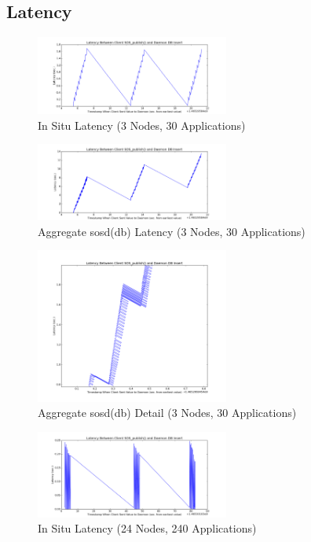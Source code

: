 
\subsection{Latency}


\begin{figure}[!t]
\centering
\includegraphics[width=2.5in]{images/aciss_latency_3_situ.png}
\caption{In Situ Latency (3 Nodes, 30 Applications)}
\label{fig_sim}
\end{figure}

\begin{figure}[!t]
\centering
\includegraphics[width=2.5in]{images/aciss_latency_3_agg.png}
\caption{Aggregate sosd(db) Latency (3 Nodes, 30 Applications)}
\label{fig_sim}
\end{figure}

\begin{figure}[!t]
\centering
\includegraphics[width=2.5in]{images/aciss_latency_3_agg_zm.png}
\caption{Aggregate sosd(db) Detail (3 Nodes, 30 Applications)}
\label{fig_sim}
\end{figure}


\begin{figure}[!t]
\centering
\includegraphics[width=2.5in]{images/aciss_latency_24_situ.png}
\caption{In Situ Latency (24 Nodes, 240 Applications)}
\label{fig_sim}
\end{figure}


